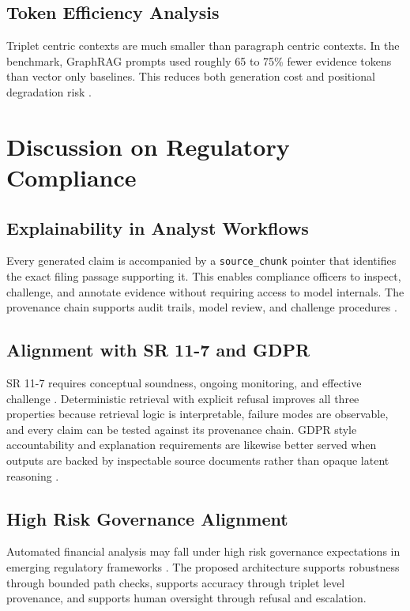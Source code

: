 \documentclass[conference]{IEEEtran}
\begin{document}
\subsection{Token Efficiency Analysis}
Triplet centric contexts are much smaller than paragraph centric contexts. In the benchmark, GraphRAG prompts used roughly 65 to 75\% fewer evidence tokens than vector only baselines. This reduces both generation cost and positional degradation risk \cite{liu2024lostmiddle,openaipricing2026,anthropicpricing2026}.

\section{Discussion on Regulatory Compliance}
\subsection{Explainability in Analyst Workflows}
Every generated claim is accompanied by a \texttt{source\_chunk} pointer that identifies the exact filing passage supporting it. This enables compliance officers to inspect, challenge, and annotate evidence without requiring access to model internals. The provenance chain supports audit trails, model review, and challenge procedures \cite{ieeeeadd,kearns2019ethical}.

\subsection{Alignment with SR 11-7 and GDPR}
SR 11-7 requires conceptual soundness, ongoing monitoring, and effective challenge \cite{sr117}. Deterministic retrieval with explicit refusal improves all three properties because retrieval logic is interpretable, failure modes are observable, and every claim can be tested against its provenance chain. GDPR style accountability and explanation requirements are likewise better served when outputs are backed by inspectable source documents rather than opaque latent reasoning \cite{gdpr,nistairmf,euaiact2024}.

\subsection{High Risk Governance Alignment}
Automated financial analysis may fall under high risk governance expectations in emerging regulatory frameworks \cite{euaiact2024,occaiprinciples,fcaai2024}. The proposed architecture supports robustness through bounded path checks, supports accuracy through triplet level provenance, and supports human oversight through refusal and escalation.
\end{document}
